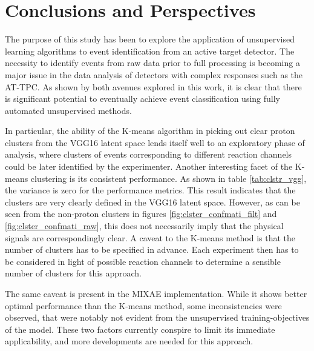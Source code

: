 \documentclass[review,number,sort&compress]{elsarticle}
\begin{document}
\section{Conclusions and Perspectives}\label{sec{conclusion}}
The purpose of this study has been to explore the application of unsupervised learning algorithms to event identification from an active target detector. The necessity to identify events from raw data prior to full processing is becoming a major issue in the data analysis of detectors with complex responses such as the AT-TPC.
As shown by both avenues explored in this work, it is clear that there is significant potential to eventually achieve event classification using fully automated unsupervised methods.

In particular, the ability of the K-means algorithm in picking out clear proton clusters from the VGG16 latent space lends itself well to an exploratory phase of analysis, where clusters of events corresponding to different reaction channels could be later identified by the experimenter.
Another interesting facet of the K-means clustering is its consistent performance. As shown in table \ref{tab:clstr_vgg}, the variance is zero for the performance metrics. This result indicates that the clusters are very clearly defined in the VGG16 latent space. However, as can be seen from the non-proton clusters in figures \ref{fig:clster_confmati_filt} and \ref{fig:clster_confmati_raw},  this does not necessarily imply that the physical signals are correspondingly clear. 
A caveat to the K-means method is that the number of clusters has to be specified in advance. Each experiment then has to be considered in light of possible reaction channels to determine a sensible number of clusters for this approach. 

The same caveat is present in the MIXAE implementation. While it shows better optimal performance than the K-means method, some inconsistencies were observed, that were notably not evident from the unsupervised training-objectives of the model. These two factors currently conspire to limit its immediate applicability, and more developments are needed for this approach. 
\end{document}
